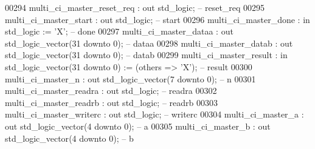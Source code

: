 \begin{DoxyCode}
00294             multi\_ci\_master\_reset\_req : \textcolor{keywordflow}{out} \textcolor{comment}{std\_logic};                                        \textcolor{keyword}{-- reset\_req}
00295             multi\_ci\_master\_start     : \textcolor{keywordflow}{out} \textcolor{comment}{std\_logic};                                        \textcolor{keyword}{-- start}
00296             multi\_ci\_master\_done      : \textcolor{keywordflow}{in}  \textcolor{comment}{std\_logic}                     := 'X';             \textcolor{keyword}{-- done}
00297             multi\_ci\_master\_dataa     : \textcolor{keywordflow}{out} \textcolor{comment}{std\_logic\_vector}(\textcolor{vhdllogic}{}\textcolor{vhdllogic}{31} \textcolor{keywordflow}{downto} \textcolor{vhdllogic}{}\textcolor{vhdllogic}{0});                    \textcolor{keyword}{-- dataa}
00298             multi\_ci\_master\_datab     : \textcolor{keywordflow}{out} \textcolor{comment}{std\_logic\_vector}(\textcolor{vhdllogic}{}\textcolor{vhdllogic}{31} \textcolor{keywordflow}{downto} \textcolor{vhdllogic}{}\textcolor{vhdllogic}{0});                    \textcolor{keyword}{-- datab}
00299             multi\_ci\_master\_result    : \textcolor{keywordflow}{in}  \textcolor{comment}{std\_logic\_vector}(\textcolor{vhdllogic}{}\textcolor{vhdllogic}{31} \textcolor{keywordflow}{downto} \textcolor{vhdllogic}{}\textcolor{vhdllogic}{0}) := (\textcolor{keywordflow}{others} => 'X'); \textcolor{keyword}{-- result}
00300             multi\_ci\_master\_n         : \textcolor{keywordflow}{out} \textcolor{comment}{std\_logic\_vector}(\textcolor{vhdllogic}{}\textcolor{vhdllogic}{7} \textcolor{keywordflow}{downto} \textcolor{vhdllogic}{}\textcolor{vhdllogic}{0});                     \textcolor{keyword}{-- n}
00301             multi\_ci\_master\_readra    : \textcolor{keywordflow}{out} \textcolor{comment}{std\_logic};                                        \textcolor{keyword}{-- readra}
00302             multi\_ci\_master\_readrb    : \textcolor{keywordflow}{out} \textcolor{comment}{std\_logic};                                        \textcolor{keyword}{-- readrb}
00303             multi\_ci\_master\_writerc   : \textcolor{keywordflow}{out} \textcolor{comment}{std\_logic};                                        \textcolor{keyword}{-- writerc}
00304             multi\_ci\_master\_a         : \textcolor{keywordflow}{out} \textcolor{comment}{std\_logic\_vector}(\textcolor{vhdllogic}{}\textcolor{vhdllogic}{4} \textcolor{keywordflow}{downto} \textcolor{vhdllogic}{}\textcolor{vhdllogic}{0});                     \textcolor{keyword}{-- a}
00305             multi\_ci\_master\_b         : \textcolor{keywordflow}{out} \textcolor{comment}{std\_logic\_vector}(\textcolor{vhdllogic}{}\textcolor{vhdllogic}{4} \textcolor{keywordflow}{downto} \textcolor{vhdllogic}{}\textcolor{vhdllogic}{0});                     \textcolor{keyword}{-- b}

\end{DoxyCode}
